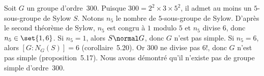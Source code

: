 Soit $G$ un groupe d'ordre~$300$.
Puisque $300 = 2^2\times 3\times 5^2$, il admet au moins un $5$-sous-groupe de Sylow $S$.
Notons $n_5$ le nombre de $5$-sous-groupe de Sylow.
D'après le second théorème de Sylow, $n_5$ est congru à $1$ modulo $5$ et $n_5$ divise $6$, donc $n_5\in\set{1, 6}$.
Si $n_5 = 1$, alors $S\normal G$, donc $G$ n'est pas simple.
Si $n_5 = 6$, alors $[G:N_G(S)] = 6$ (corollaire~5.20).
Or $300$ ne divise pas $6!$, donc $G$ n'est pas simple (proposition~5.17).
Nous avons démontré qu'il n'existe pas de groupe simple d'ordre~$300$.

